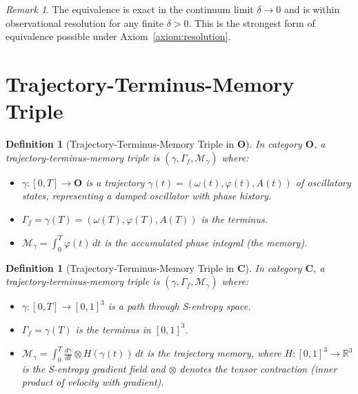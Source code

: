 \documentclass[twocolumn,10pt]{article}
\newtheorem{definition}[theorem]{Definition}
\theoremstyle{remark}
\newtheorem{remark}[theorem]{Remark}
\newcommand{\CatO}{\mathbf{O}}
\newcommand{\CatC}{\mathbf{C}}
\begin{document}
\begin{remark}
The equivalence is exact in the continuum limit $\delta \to 0$ and is within observational resolution for any finite $\delta > 0$.
This is the strongest form of equivalence possible under Axiom~\ref{axiom:resolution}.
\end{remark}

\section{Trajectory-Terminus-Memory Triple}
\label{sec:ttm}

\begin{definition}[Trajectory-Terminus-Memory Triple in $\CatO$]
\label{def:ttm_O}
In category $\CatO$, a \emph{trajectory-terminus-memory triple} is $(\gamma, \Gamma_f, \mathcal{M}_\gamma)$ where:
\begin{itemize}
    \item $\gamma: [0,T] \to \CatO$ is a trajectory $\gamma(t) = (\omega(t), \varphi(t), A(t))$ of oscillatory states, representing a damped oscillator with phase history.
    \item $\Gamma_f = \gamma(T) = (\omega(T), \varphi(T), A(T))$ is the terminus.
    \item $\mathcal{M}_\gamma = \int_0^T \varphi(t)\,dt$ is the accumulated phase integral (the memory).
\end{itemize}
\end{definition}

\begin{definition}[Trajectory-Terminus-Memory Triple in $\CatC$]
\label{def:ttm_C}
In category $\CatC$, a \emph{trajectory-terminus-memory triple} is $(\gamma, \Gamma_f, \mathcal{M}_\gamma)$ where:
\begin{itemize}
    \item $\gamma: [0,T] \to [0,1]^3$ is a path through S-entropy space.
    \item $\Gamma_f = \gamma(T)$ is the terminus in $[0,1]^3$.
    \item $\mathcal{M}_\gamma = \int_0^T \frac{d\gamma}{dt} \otimes H(\gamma(t))\,dt$ is the trajectory memory, where $H: [0,1]^3 \to \mathbb{R}^3$ is the S-entropy gradient field and $\otimes$ denotes the tensor contraction (inner product of velocity with gradient).
\end{itemize}
\end{definition}
\end{document}
